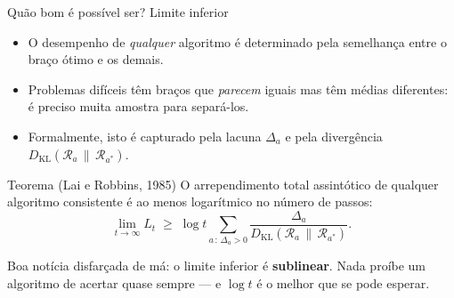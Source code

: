 \documentclass[aspectratio=169, 10pt]{beamer}
\newcommand{\gap}{\Delta}
\newcommand{\KL}{D_{\mathrm{KL}}}
\newcommand{\Reg}{L}
\begin{document}
\begin{frame}{Quão bom é possível ser? Limite inferior}
  \begin{itemize}
    \item O desempenho de \emph{qualquer} algoritmo é determinado pela
          semelhança entre o braço ótimo e os demais.
    \item Problemas difíceis têm braços que \emph{parecem} iguais mas têm
          médias diferentes: é preciso muita amostra para separá-los.
    \item Formalmente, isto é capturado pela lacuna $\gap_a$ e pela
          divergência $\KL(\mathcal{R}_a \,\|\, \mathcal{R}_{a^{*}})$.
  \end{itemize}

  \begin{teobox}{Teorema (Lai e Robbins, 1985)}
    O arrependimento total assintótico de qualquer algoritmo consistente é
    ao menos logarítmico no número de passos:
    \[
      \lim_{t \to \infty} \Reg_t \;\ge\; \log t
        \sum_{a \,:\, \gap_a > 0} \frac{\gap_a}{\KL(\mathcal{R}_a \,\|\, \mathcal{R}_{a^{*}})}.
    \]
  \end{teobox}

  \begin{ideiabox}
    Boa notícia disfarçada de má: o limite inferior é \textbf{sublinear}.
    Nada proíbe um algoritmo de acertar quase sempre --- e $\log t$ é o
    melhor que se pode esperar.
  \end{ideiabox}
\end{frame}
\end{document}
